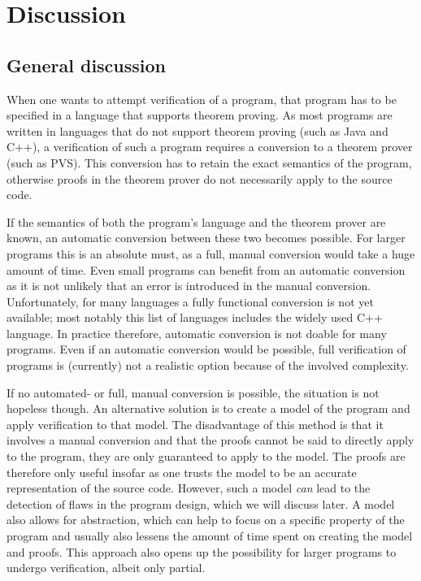 \hypertarget{discussion}{\chapter{Discussion}}

\begin{epigraphs}
\end{epigraphs}

\section{General discussion}
When one wants to attempt verification of a program, that program has to be specified in a language that supports theorem proving. As most programs are written in languages that do not support theorem proving (such as Java and C++), a verification of such a program requires a conversion to a theorem prover (such as PVS). This conversion has to retain the exact semantics of the program, otherwise proofs in the theorem prover do not necessarily apply to the source code.\emptyline

If the semantics of both the program's language and the theorem prover are known, an automatic conversion between these two becomes possible. For larger programs this is an absolute must, as a full, manual conversion would take a huge amount of time. Even small programs can benefit from an automatic conversion as it is not unlikely that an error is introduced in the manual conversion. Unfortunately, for many languages a fully functional conversion is not yet available; most notably this list of languages includes the widely used C++ language. In practice therefore, automatic conversion is not doable for many programs. Even if an automatic conversion would be possible, full verification of programs is (currently) not a realistic option because of the involved complexity.\emptyline

If no automated- or full, manual conversion is possible, the situation is not hopeless though. An alternative solution is to create a model of the program and apply verification to that model. The disadvantage of this method is that it involves a manual conversion and that the proofs cannot be said to directly apply to the program, they are only guaranteed to apply to the model. The proofs are therefore only useful insofar as one trusts the model to be an accurate representation of the source code. However, such a model \textit{can} lead to the detection of flaws in the program design, which we will discuss later. A model also allows for abstraction, which can help to focus on a specific property of the program and usually also lessens the amount of time spent on creating the model and proofs. This approach also opens up the possibility for larger programs to undergo verification, albeit only partial.\emptyline

